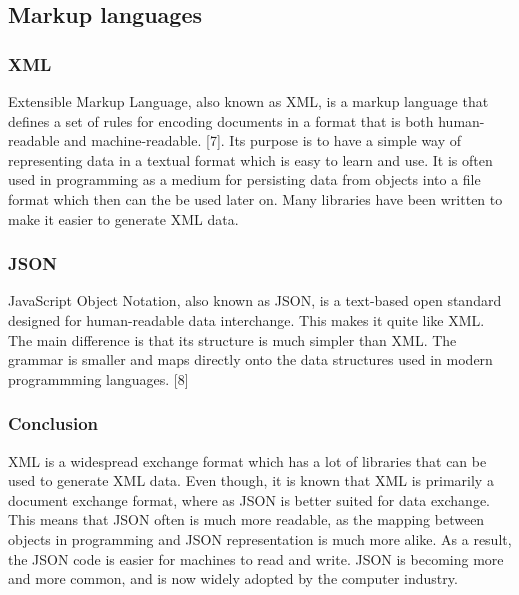 \subsection{Markup languages}

\subsubsection{XML}
Extensible Markup Language, also known as XML, is a markup language that defines a set of rules for encoding documents in a format that is both human-readable and machine-readable.  [7]. Its purpose is to have a simple way of representing data in a textual format which is easy to learn and use. It is often used in programming as a medium for persisting data from objects into a file format which then can the be used later on. Many libraries have been written to make it easier to generate XML data.

\subsubsection{JSON}
JavaScript Object Notation, also known as JSON, is a text-based open standard designed for human-readable data interchange. This makes it quite like XML. The main difference is that its structure is much simpler than XML. The grammar is smaller and maps directly onto the data structures used in modern programmming languages. [8]

\subsubsection{Conclusion}
XML is a widespread exchange format which has a lot of libraries that can be used to generate XML data. Even though, it is known that XML is primarily a document exchange format, where as JSON is better suited for data exchange. This means that JSON often is much more readable, as the mapping between objects in programming and JSON representation is much more alike. As a result, the JSON code is easier for machines to read and write. JSON is becoming more and more common, and is now widely adopted by the computer industry. 
